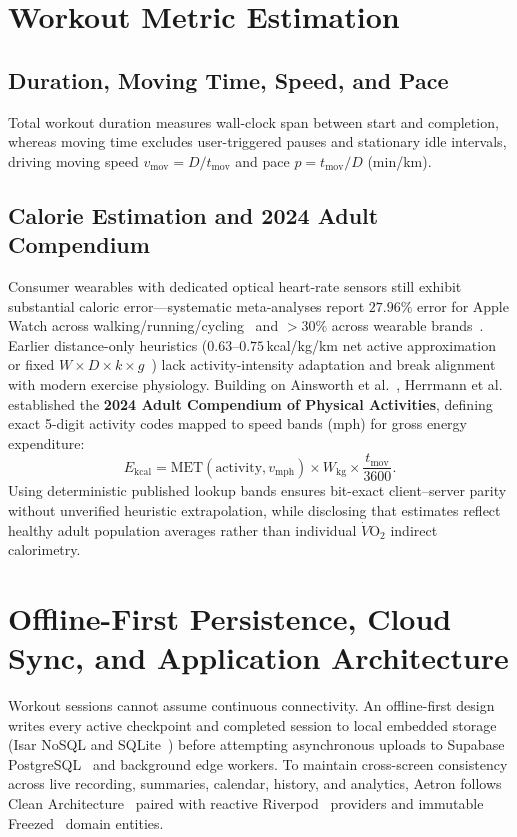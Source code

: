 \section{Workout Metric Estimation}
\label{sec:metric_estimation}

\subsection{Duration, Moving Time, Speed, and Pace}
Total workout duration measures wall-clock span between start and completion, whereas moving time excludes user-triggered pauses and stationary idle intervals, driving moving speed $v_{\text{mov}} = D / t_{\text{mov}}$ and pace $p = t_{\text{mov}} / D$ (min/km).

\subsection{Calorie Estimation and 2024 Adult Compendium}
Consumer wearables with dedicated optical heart-rate sensors still exhibit substantial caloric error---systematic meta-analyses report $27.96\%$ error for Apple Watch across walking/running/cycling~\cite{choe2025apple} and $>30\%$ across wearable brands~\cite{germini2022wearables}. Earlier distance-only heuristics ($0.63$--$0.75$\,kcal/kg/km net active approximation~\cite{hall2004energy} or fixed $W \times D \times k \times g$~\cite{aetron2026prethesis}) lack activity-intensity adaptation and break alignment with modern exercise physiology. Building on Ainsworth et al.~\cite{ainsworth2011compendium}, Herrmann et al.~\cite{herrmann2024compendium} established the \textbf{2024 Adult Compendium of Physical Activities}, defining exact 5-digit activity codes mapped to speed bands (mph) for gross energy expenditure:
\begin{equation}
    E_{\text{kcal}} = \text{MET}(\text{activity}, v_{\text{mph}}) \times W_{\text{kg}} \times \frac{t_{\text{mov}}}{3600}.
    \label{eq:compendium_2024}
\end{equation}
Using deterministic published lookup bands ensures bit-exact client--server parity without unverified heuristic extrapolation, while disclosing that estimates reflect healthy adult population averages rather than individual $\dot{V}\text{O}_2$ indirect calorimetry.

\section{Offline-First Persistence, Cloud Sync, and Application Architecture}
Workout sessions cannot assume continuous connectivity. An offline-first design writes every active checkpoint and completed session to local embedded storage (Isar NoSQL and SQLite~\cite{isar2024database,sqflite2024}) before attempting asynchronous uploads to Supabase PostgreSQL~\cite{supabase2024backend} and background edge workers. To maintain cross-screen consistency across live recording, summaries, calendar, history, and analytics, Aetron follows Clean Architecture~\cite{martin2017clean} paired with reactive Riverpod~\cite{riverpod2024state} providers and immutable Freezed~\cite{freezed2024} domain entities.


